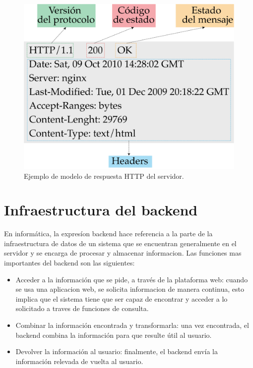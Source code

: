 \begin{figure}[htpb]
	\centering
	\includegraphics[scale=.50]{./Figures/respuesta-http.png}
	\caption[Modelo de respuesta HTTP ]{Ejemplo de modelo de respuesta HTTP del servidor.}
	\label{fig:respuesta-http}
\end{figure}


\section{Infraestructura del backend}

En informática, la expresíon backend hace referencia a la parte de la infraestructura de datos de un sistema que se encuentran generalmente en el servidor y se encarga de procesar y almacenar informacion.  Las funciones mas importantes del backend son las siguientes:

\begin{itemize}
	\item Acceder a la información que se pide, a través de la plataforma web: cuando se usa una aplicacion web, se solicita informacion de manera continua, esto implica que el sistema tiene que ser capaz de encontrar y acceder a lo solicitado a traves de funciones de consulta. 
	
	\item Combinar la información encontrada y transformarla: una vez encontrada, el backend combina la información para que resulte útil al usuario.
	
	\item Devolver la información al usuario:  finalmente, el backend envía la información relevada de vuelta al usuario. 
	
\end{itemize}

